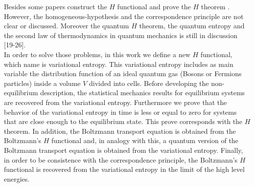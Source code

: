 \documentclass{article}
\begin{document}
{Besides some papers construct the $H$ functional and prove the $H$ theorem \cite{htheorem2, quantum1, quantum2}. However, the homogeneous-hypothesis and the correspondence principle are not clear or discussed. Moreover the quantum $H$ theorem, the quantum entropy and the second law of thermodynamics in quantum mechanics is still in discussion [19-26].\\ %
In order to solve those problems, in this work we define a new $H$ functional, which name is variational entropy. This variational entropy includes as main variable the distribution function of an ideal quantum gas (Bosons or Fermions particles) inside a volume $V$ divided into cells. Before developing the non-equilibrium description, the statistical mechanics results for equilibrium systems are recovered from the variational entropy. Furthermore we prove that the behavior of the variational entropy in time is less or equal to zero for systems that are close enough to the equilibrium state. This prove corresponds with the $H$ theorem. In addition, the Boltzmann transport equation is obtained from the Boltzmann's $H$ functional and, in analogy with this, a quantum version of the Boltzmann transport equation is obtained from the variational entropy. Finally, in order to be consistence with the correspondence principle, the Boltzmann's $H$ functional is recovered from the variational entropy in the limit of the high level energies.}
\end{document}
